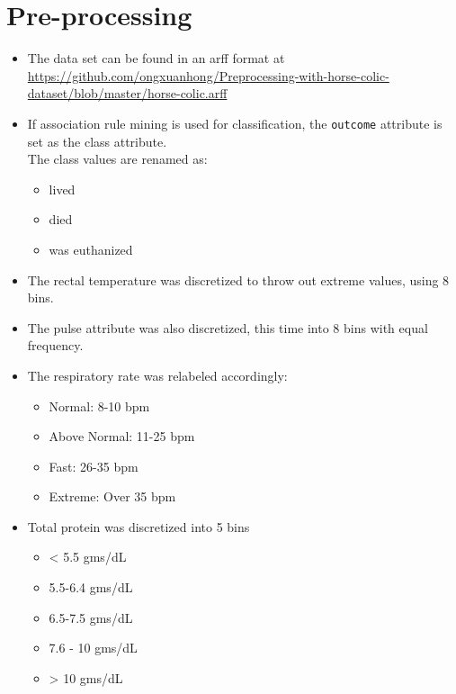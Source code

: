 \section{Pre-processing}

\begin{itemize}

\item The data set can be found in an arff format at \\ \href{github.com/ongxuanhong/Preprocessing-with-horse-colic-dataset/blob/master/horse-colic.arff}{https://github.com/ongxuanhong/Preprocessing-with-horse-colic-dataset/blob/master/horse-colic.arff}

\item If association rule mining is used for classification, the \verb|outcome| attribute is set as the class attribute.\\
The class values are renamed as:
\begin{itemize}
\item lived
\item died
\item was euthanized
\end{itemize}

\item The rectal temperature was discretized to throw out extreme values, using 8 bins.

\item The pulse attribute was also discretized, this time into 8 bins with equal frequency.

\item The respiratory rate was relabeled accordingly:
\begin{itemize}
\item Normal: 8-10 bpm
\item Above Normal: 11-25 bpm
\item Fast: 26-35 bpm
\item Extreme: Over 35 bpm
\end{itemize}

\item Total protein was discretized into 5 bins
\begin{itemize}
\item < 5.5 gms/dL
\item 5.5-6.4 gms/dL
\item 6.5-7.5 gms/dL
\item 7.6 - 10 gms/dL
\item > 10 gms/dL
\end{itemize}



\end{itemize}
